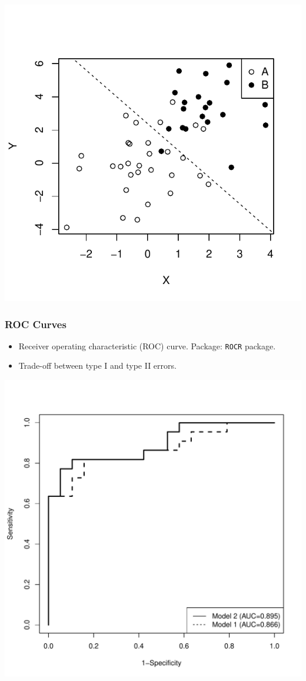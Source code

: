 \begin{frame}[fragile]
\begin{knitrout}\footnotesize
{}\color{fgcolor}\begin{kframe}
\begin{alltt}
  \hlstd{=}\hlopt{==}\hlstd{,} \hlstd{,} \hlstd{)))}
\hlopt{/}\hlstd{ss1[}\hlstd{],} \hlopt{-}\hlstd{ss1[}\hlstd{]}\hlopt{/}\hlstd{ss1[}\hlstd{],} \hlstd{=}\hlstd{)}
\hlstd{(}\hlstd{,}
       \hlstd{=}\hlstd{(}\hlstd{,} \hlstd{),}
       \hlstd{=}\hlstd{(}\hlstd{,}\hlstd{))}
\end{alltt}
\end{kframe}

{\centering \includegraphics[width=.6\linewidth]{figure/beamer-lda-plot-1} 

}



\end{knitrout}
  
\end{frame}

\begin{frame}[fragile]
  \frametitle{ROC Curves}
  \begin{itemize}
  \item Receiver operating characteristic (ROC) curve.  Package: \texttt{ROCR}
    package.
  \item Trade-off between type I and type II errors.
  \end{itemize}
  {\centering \includegraphics[width=.48\linewidth]{roc}}
\end{frame}

